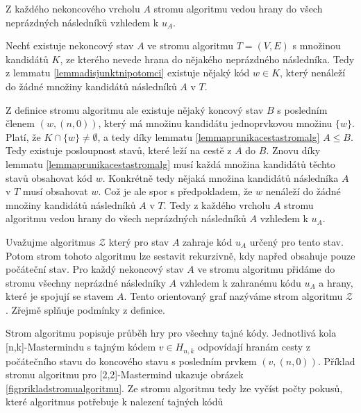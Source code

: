 \begin{tvrz}\label{tvrzvsichninaslednici}
    Z každého nekoncového vrcholu $A$ stromu algoritmu vedou hrany do všech neprázdných následníků vzhledem k $u_A$.
\end{tvrz}
\begin{dukaz}
    Nechť existuje nekoncový stav $A$ ve stromu algoritmu $T = (V,E)$ s množinou kandidátů $K$, ze kterého nevede hrana do nějakého neprázdného následníka. Tedy z lemmatu \ref{lemmadisjunktnipotomci} existuje nějaký kód $w \in K$, který nenáleží do žádné množiny kandidátů následníků $A$ v $T$. 

    Z definice stromu algoritmu ale existuje nějaký koncový stav $B$ s posledním členem $(w,(n,0))$, který má množinu kandidátu jednoprvkovou množinu $\{w\}$. Platí, že $K\cap \{w\} \neq \emptyset$, a tedy díky lemmatu \ref{lemmaprunikacestastromalg} $A \leq B$. Tedy existuje posloupnost stavů, které leží na cestě z $A$ do $B$. Znovu díky lemmatu \ref{lemmaprunikacestastromalg} musí každá množina kandidátů těchto stavů obsahovat kód $w$. Konkrétně tedy nějaká množina kandidátů následníka $A$ v $T$ musí obsahovat $w$. Což je ale spor s předpokladem, že $w$ nenáleží do žádné množiny kandidátů následníků $A$ v $T$. Tedy z každého vrcholu $A$ stromu algoritmu vedou hrany do všech neprázdných následníků $A$ vzhledem k $u_A$. 
\end{dukaz}


\begin{pozn}
    Uvažujme algoritmus $\mathcal{Z}$ který pro stav $A$ zahraje kód $u_A$ určený pro tento stav. Potom strom tohoto algoritmu lze sestavit rekurzivně, kdy napřed obsahuje pouze počáteční stav. Pro každý nekoncový stav $A$ ve stromu algoritmu přidáme do stromu všechny neprázdné následníky $A$ vzhledem k zahranému kódu $u_A$ a hrany, které je spojují se stavem $A$. Tento orientovaný graf nazýváme strom algoritmu $\mathcal{Z}$. Zřejmě splňuje podmínky z definice. 
\end{pozn}
 Strom algoritmu popisuje průběh hry pro všechny tajné kódy. Jednotlivá kola [n,k]-Mastermindu s tajným kódem $v\in H_{n,k}$ odpovídají hranám cesty z počátečního stavu do koncového stavu s posledním prvkem $(v,(n,0))$. Příklad stromu algoritmu pro [2,2]-Mastermind ukazuje obrázek \ref{figprikladstromualgoritmu}. Ze stromu algoritmu tedy lze vyčíst počty pokusů, které algoritmus potřebuje k nalezení tajných kódů

